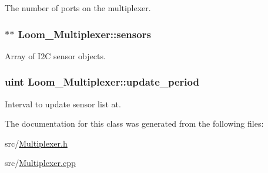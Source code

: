 The number of ports on the multiplexer. 

\subsubsection[{\texorpdfstring{sensors}{sensors}}]{$\ast$$\ast$ Loom\+\_\+\+Multiplexer\+::sensors\hspace{0.3cm}{\ttfamily [protected]}}\hypertarget{class_loom___multiplexer_a1ca4e73888b5d46fef8c09997148a937}{}\label{class_loom___multiplexer_a1ca4e73888b5d46fef8c09997148a937}


Array of I2C sensor objects. 

\subsubsection[{\texorpdfstring{update\+\_\+period}{update_period}}]{\setlength{\rightskip}{0pt plus 5cm}uint Loom\+\_\+\+Multiplexer\+::update\+\_\+period\hspace{0.3cm}{\ttfamily [protected]}}\hypertarget{class_loom___multiplexer_a34d6b989ed4a1b5059fd28c277f9b0c9}{}\label{class_loom___multiplexer_a34d6b989ed4a1b5059fd28c277f9b0c9}


Interval to update sensor list at. 



The documentation for this class was generated from the following files\+:\begin{DoxyCompactItemize}
\item 
src/\hyperlink{_multiplexer_8h}{Multiplexer.\+h}\item 
src/\hyperlink{_multiplexer_8cpp}{Multiplexer.\+cpp}\end{DoxyCompactItemize}
